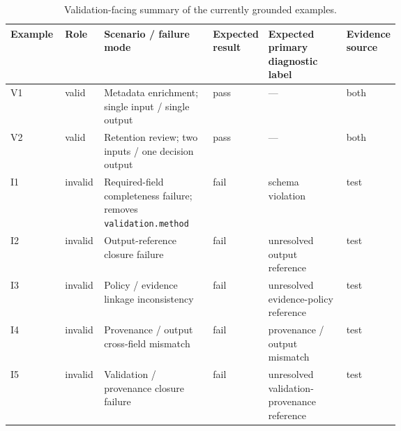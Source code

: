 \begin{table}[t]
\centering
\scriptsize
\setlength{\tabcolsep}{3pt}
\renewcommand{\arraystretch}{1.15}
\caption{Validation-facing summary of the currently grounded examples.}
\label{tab:validation-summary}
\begin{tabularx}{\linewidth}{P{0.14\linewidth}P{0.10\linewidth}YP{0.11\linewidth}P{0.20\linewidth}P{0.10\linewidth}}
\toprule
Example & Role & Scenario / failure mode & Expected result & Expected primary diagnostic label & Evidence source \\
\midrule
V1 &
valid &
Metadata enrichment; single input / single output &
pass &
--- &
both \\
V2 &
valid &
Retention review; two inputs / one decision output &
pass &
--- &
both \\
I1 &
invalid &
Required-field completeness failure; removes \texttt{validation.method} &
fail &
schema violation &
test \\
I2 &
invalid &
Output-reference closure failure &
fail &
unresolved output reference &
test \\
I3 &
invalid &
Policy / evidence linkage inconsistency &
fail &
unresolved evidence-policy reference &
test \\
I4 &
invalid &
Provenance / output cross-field mismatch &
fail &
provenance / output mismatch &
test \\
I5 &
invalid &
Validation / provenance closure failure &
fail &
unresolved validation-provenance reference &
test \\
\bottomrule
\end{tabularx}
\end{table}
